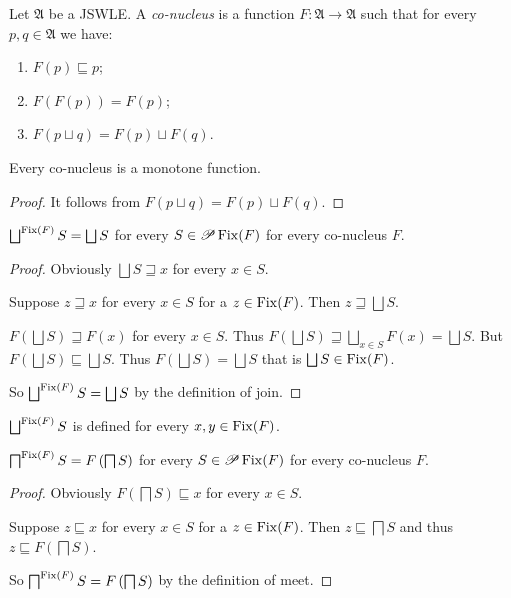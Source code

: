 \begin{defn}
Let $\mathfrak{A}$ be a JSWLE. A \emph{co-nucleus} is a function
$F:\mathfrak{A}\rightarrow\mathfrak{A}$ such that for every $p,q\in\mathfrak{A}$
we have:
\begin{enumerate}
\item \label{co-nucleus-less}$F(p)\sqsubseteq p$;
\item $F(F(p))=F(p)$;
\item $F(p\sqcup q)=F(p)\sqcup F(q)$.
\end{enumerate}
\end{defn}
\begin{prop}
Every co-nucleus is a monotone function.\end{prop}
\begin{proof}
It follows from $F(p\sqcup q)=F(p)\sqcup F(q)$.\end{proof}
\begin{lem}
$\bigsqcup^{\operatorname{Fix}(F)}S=\bigsqcup S$ for every $S\in\mathscr{P}\operatorname{Fix}(F)$
for every co-nucleus $F$.\end{lem}
\begin{proof}
Obviously $\bigsqcup S\sqsupseteq x$ for every $x\in S$.

Suppose $z\sqsupseteq x$ for every $x\in S$ for a $z\in\operatorname{Fix}(F)$.
Then $z\sqsupseteq\bigsqcup S$.

$F\left(\bigsqcup S\right)\sqsupseteq F(x)$ for every $x\in S$.
Thus $F\left(\bigsqcup S\right)\sqsupseteq\bigsqcup_{x\in S}F(x)=\bigsqcup S$.
But $F\left(\bigsqcup S\right)\sqsubseteq\bigsqcup S$. Thus $F\left(\bigsqcup S\right)=\bigsqcup S$
that is $\bigsqcup S\in\operatorname{Fix}(F)$.

So $\bigsqcup^{\operatorname{Fix}(F)}S=\bigsqcup S$ by the definition of join.\end{proof}
\begin{cor}
$\bigsqcup^{\operatorname{Fix}(F)}S$ is defined for every $x,y\in\operatorname{Fix}(F)$.\end{cor}
\begin{lem}
$\bigsqcap^{\operatorname{Fix}(F)}S=F\left(\bigsqcap S\right)$ for every $S\in\mathscr{P}\operatorname{Fix}(F)$
for every co-nucleus $F$.\end{lem}
\begin{proof}
Obviously $F\left(\bigsqcap S\right)\sqsubseteq x$ for every $x\in S$.

Suppose $z\sqsubseteq x$ for every $x\in S$ for a $z\in\operatorname{Fix}(F)$.
Then $z\sqsubseteq\bigsqcap S$ and thus $z\sqsubseteq F\left(\bigsqcap S\right)$.

So $\bigsqcap^{\operatorname{Fix}(F)}S=F\left(\bigsqcap S\right)$ by the definition
of meet.\end{proof}
